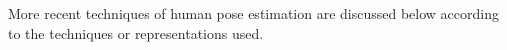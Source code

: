 
More recent techniques of human pose estimation are discussed below according to the techniques or representations used.

